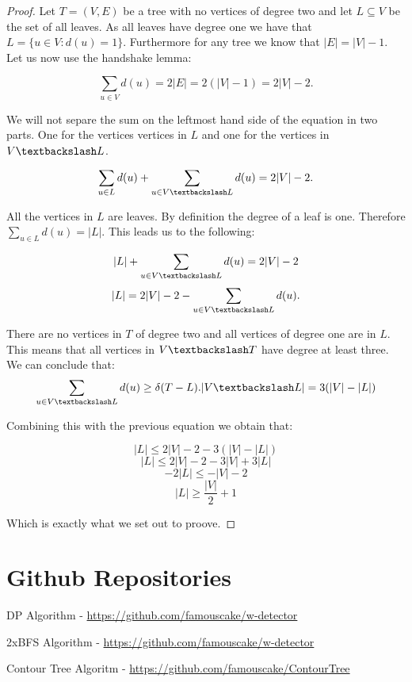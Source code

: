 \begin{appendices}
\begin{proof}
    Let $T = (V, E)$ be a tree with no vertices of degree two and let $L \subseteq V$ be the set of all leaves. As all leaves have degree one we have that $L = \{u \in V: d(u) = 1\}$. Furthermore for any tree we know that $|E| = |V| - 1$. Let us now use the handshake lemma:

    $$ \sum_{u \in V}{d(u)} = 2|E| = 2(|V| - 1) = 2|V| - 2.$$

    We will not separe the sum on the leftmost hand side of the equation in two parts. One for the vertices vertices in $L$ and one for the vertices in $V\textbackslash L$.


    $$ \sum_{u \in L}{d(u)} + \sum_{u \in V\textbackslash L}{d(u)} = 2|V| - 2.$$

    All the vertices in $L$ are leaves. By definition the degree of a leaf is one. Therefore $\sum_{u \in L}{d(u)} = |L|$. This leads us to the following:

    $$  |L| + \sum_{u \in V\textbackslash L}{d(u)} = 2|V| - 2$$
    $$  |L|  = 2|V| - 2 - \sum_{u \in V\textbackslash L}{d(u)}.$$

    There are no vertices in $T$ of degree two and all vertices of degree one are in $L$. This means that all vertices in $V \textbackslash T$ have degree at least three. We can conclude that:
    $$\sum_{u \in V\textbackslash L}{d(u)} \ge \delta(T - L).|V\textbackslash L| = 3(|V| - |L|) $$

    Combining this with the previous equation we obtain that:

    $$  |L| \le 2|V| - 2 - 3(|V| - |L|)$$
    $$  |L| \le 2|V| - 2 - 3|V| + 3|L|$$
    $$  -2|L| \le -|V| - 2$$
    $$  |L| \ge \frac{|V|}{2} + 1$$

    Which is exactly what we set out to proove.


\end{proof}


\chapter{Github Repositories}
\label{chapter-github}


DP Algorithm - \url{https://github.com/famouscake/w-detector}

2xBFS Algorithm - \url{https://github.com/famouscake/w-detector}

Contour Tree Algoritm - \url{https://github.com/famouscake/ContourTree}



\end{appendices}


